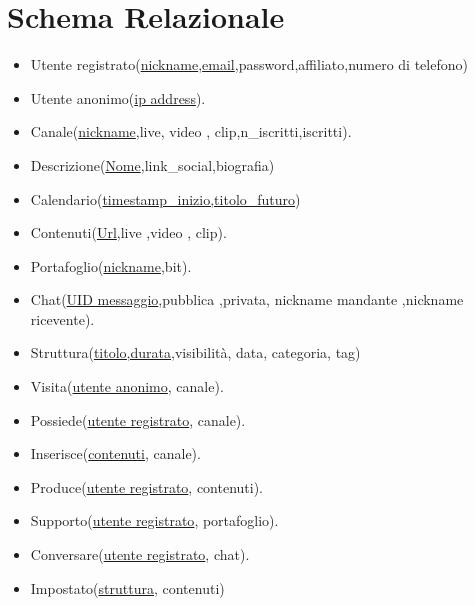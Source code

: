 \section{Schema Relazionale}
\begin{itemize}
    \item Utente registrato(\underline{nickname},\underline{email},password,affiliato,numero di telefono)
    \item Utente anonimo(\underline{ip address}).
    \item Canale(\underline{nickname},live, video , clip,n\_iscritti,iscritti).
    \item Descrizione(\underline{Nome},link\_social,biografia) 
    \item Calendario(\underline{timestamp\_inizio,titolo\_futuro})
    \item Contenuti(\underline{Url},live ,video , clip).
    \item Portafoglio(\underline{nickname},bit). 
    \item Chat(\underline{UID messaggio},pubblica ,privata, nickname mandante ,nickname ricevente). 
    \item Struttura(\underline{titolo,durata},visibilità, data, categoria, tag)
    \item Visita(\underline{utente anonimo}, canale).
    \item Possiede(\underline{utente registrato}, canale).
    \item Inserisce(\underline{contenuti}, canale).
    \item Produce(\underline{utente registrato}, contenuti).
    \item Supporto(\underline{utente registrato}, portafoglio).
    \item Conversare(\underline{utente registrato}, chat).
    \item Impostato(\underline{struttura}, contenuti)
\end{itemize}
